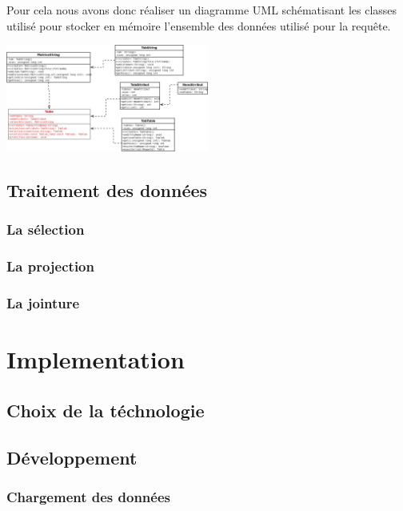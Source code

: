\documentclass[oneside,13pt,a4paper]{report}
\begin{document}
            Pour cela nous avons donc réaliser un diagramme UML schématisant les classes utilisé pour stocker en mémoire l’ensemble des données utilisé pour la requête.

            \includegraphics[width=0.5\textwidth]{img/sql.png}\par

        \section{Traitement des données}

            \subsection{La sélection}

            \subsection{La projection}

            \subsection{La jointure}


    \chapter{Implementation}

        \section{Choix de la téchnologie}

        \section{Développement}

            \subsection{Chargement des données}
\end{document}
